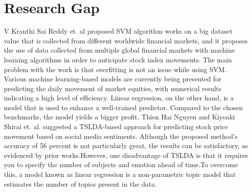 \section{Research Gap}

V Kranthi Sai Reddy et. al\cite{reddy2018stock} proposed SVM algorithm works on a big dataset value that is collected from different worldwide financial markets, and it proposes the use of data collected from multiple global financial markets with machine learning algorithms in order to anticipate stock index movements. The main problem with the work is that overfitting is not an issue while using SVM. Various machine learning-based models are currently being presented for predicting the daily movement of market equities, with numerical results indicating a high level of efficiency. Linear regression, on the other hand, is a model that is used to enhance a well-trained predictor. Compared to the chosen benchmarks, the model yields a bigger profit. Thien Hai Nguyen and Kiyoaki Shirai et. al.\cite{nguyen2015topic} suggested a TSLDA-based approach for predicting stock price movement based on social media sentiments. Although the proposed method's accuracy of 56 percent is not particularly great, the results can be satisfactory, as evidenced by prior works.However, one disadvantage of TSLDA is that it requires you to specify the number of subjects and emotion ahead of time.To overcome this, a model known as linear regression is a non-parametric topic model that estimates the number of topics present in the data.

